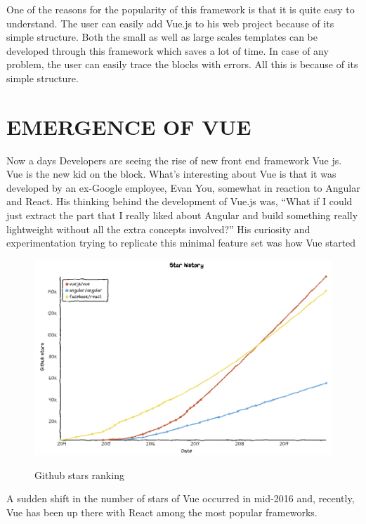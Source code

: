 \documentclass[12pt,a4paper,oneside]{report}
\begin{document}
\par 
One of the reasons for the popularity of this framework is that it is
quite easy to understand. The user can easily add Vue.js to his web
project because of its simple structure. Both the small as well as
large scales templates can be developed through this framework
which saves a lot of time. In case of any problem, the user can
easily trace the blocks with errors. All this is because of its simple
structure.




\chapter{EMERGENCE OF VUE}
\par 
Now a days Developers are seeing the rise of new front end framework Vue js. Vue is the new kid on the block. What’s interesting about Vue is that it was developed by an ex-Google employee, Evan You, somewhat in reaction to Angular and React. His thinking behind the development of Vue.js was, “What if I could just extract the part that I really liked about Angular and build something really lightweight without all the extra concepts involved?” His curiosity and experimentation trying to replicate this minimal feature set was how Vue started
\begin{figure}[H]
    \begin{center}
        \label{abc}
            \includegraphics[scale=.4]{vuegithub.png}
            \caption{ Github stars ranking\cite{githubStars}}
    \end{center}
\end{figure}
\par 
A sudden shift in the number of stars of Vue occurred in mid-2016 and, recently, Vue has been up there with React among the most popular frameworks.
\end{document}
